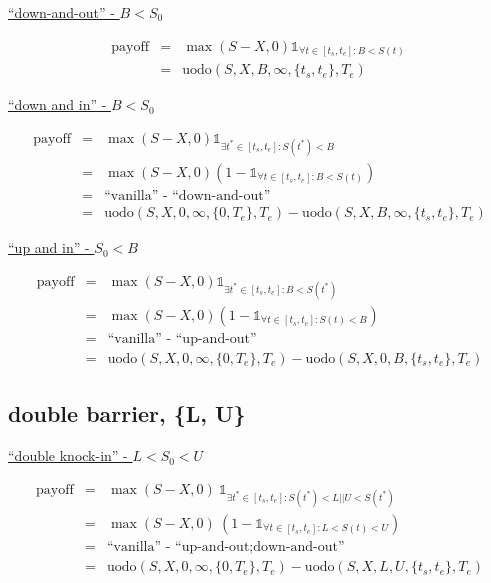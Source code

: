 \documentclass[12pt,twoside]{article}
\begin{document}
\noindent \underline{``down-and-out'' - $B < S_0$}

\begin{eqnarray}
 \text{payoff} & = & \max(S - X, 0) \mathbb{1}_{\forall t \in [t_s, t_e]: B < S(t)}\ \nonumber \\
               & = & \text{uodo}(S, X, B, \infty, \{t_{s}, t_e\}, T_{e})
\end{eqnarray}

\noindent \underline{``down and in'' - $ B < S_0$}

\begin{eqnarray}
 \text{payoff} & = & \max(S-X, 0) \mathbb{1}_{\exists t^{\ast} \in [t_s, t_e]: S(t^{\ast}) < B}\ \nonumber \\
               & = & \max(S-X, 0) \left(1 - \mathbb{1}_{\forall t \in [t_s, t_e]: B < S(t)} \right)\ \nonumber \\
               & = & \text{``vanilla'' - ``down-and-out''} \nonumber \\
               & = & \text{uodo}(S, X, 0, \infty, \{0, T_{e}\}, T_{e}) - \text{uodo}(S, X, B, \infty, \{t_{s}, t_e\}, T_{e})
\end{eqnarray}

\noindent \underline{``up and in'' - $ S_0 < B$}

\begin{eqnarray}
 \text{payoff} & = & \max(S-X, 0) \mathbb{1}_{\exists t^{\ast} \in [t_s, t_e]: B < S(t^{\ast})}\ \nonumber \\
               & = & \max(S-X, 0) \left(1 - \mathbb{1}_{\forall t \in [t_s, t_e]: S(t) < B} \right)\ \nonumber \\
               & = & \text{``vanilla'' - ``up-and-out''} \nonumber \\
               & = & \text{uodo}(S, X, 0, \infty, \{0, T_{e}\}, T_{e}) - \text{uodo}(S, X, 0, B, \{t_{s}, t_e\}, T_{e})
\end{eqnarray}


\subsection{double barrier, \{L, U\}}

\noindent \underline{``double knock-in'' - $L < S_{0} < U$}

\begin{eqnarray}
 \text{payoff} & = & \max(S-X, 0)\ \mathbb{1}_{\exists t^{\ast} \in [t_s, t_e]: S(t^{\ast}) < L || U < S(t^{\ast})} \nonumber \\
               & = & \max(S-X, 0)\ \left(1 -  \mathbb{1}_{\forall t \in [t_s,  t_e]: L < S(t) < U}\right) \nonumber \\
               & = & \text{``vanilla'' - ``up-and-out;down-and-out''} \nonumber \\
               & = & \text{uodo}(S, X, 0, \infty, \{0, T_{e}\}, T_{e}) - \text{uodo}(S, X, L, U, \{t_{s}, t_e\}, T_{e})
\end{eqnarray}




\end{document}
